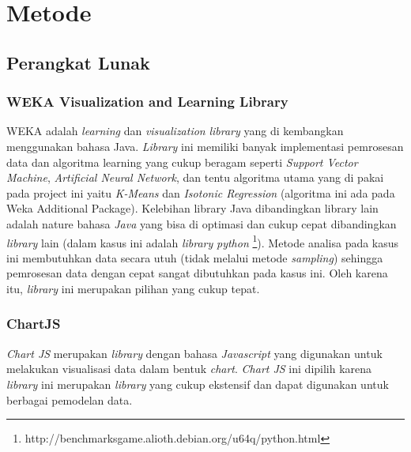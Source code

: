 \documentclass{article}
\begin{document}
\section{Metode}

\subsection{Perangkat Lunak}

\subsubsection{WEKA Visualization and Learning Library}
\begin{adjustwidth}{4em}{0pt}

\hspace{\parindent}WEKA adalah \textit{learning} dan \textit{visualization} \textit{library} yang di kembangkan menggunakan bahasa Java. \textit{Library} ini memiliki banyak implementasi pemrosesan data dan algoritma learning yang cukup beragam seperti \textit{Support Vector Machine}, \textit{Artificial Neural Network}, dan tentu algoritma utama yang di pakai pada project ini yaitu \textit{K-Means} dan \textit{Isotonic Regression} (algoritma ini ada pada Weka Additional Package). Kelebihan library Java dibandingkan library lain adalah nature bahasa \textit{Java} yang bisa di optimasi dan cukup cepat dibandingkan \textit{library} lain (dalam kasus ini adalah \textit{library} \textit{python} \footnote{http://benchmarksgame.alioth.debian.org/u64q/python.html}). Metode analisa pada kasus  ini membutuhkan data secara utuh (tidak melalui metode \textit{sampling}) sehingga pemrosesan data dengan cepat sangat dibutuhkan pada kasus ini. Oleh karena itu, \textit{library} ini merupakan pilihan yang cukup tepat.

\end{adjustwidth}

\subsubsection{ChartJS}
\begin{adjustwidth}{4em}{0pt}
	
\hspace{\parindent}\textit{Chart JS} merupakan \textit{library} dengan bahasa \textit{Javascript} yang digunakan untuk melakukan visualisasi data dalam bentuk \textit{chart}. \textit{Chart JS} ini dipilih karena \textit{library} ini merupakan \textit{library} yang cukup ekstensif dan dapat digunakan untuk berbagai pemodelan data.

\end{adjustwidth}
\end{document}
